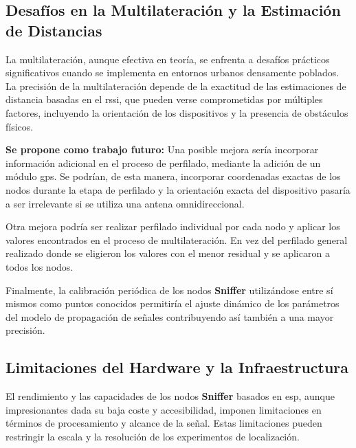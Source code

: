 \subsection{Desafíos en la Multilateración y la Estimación de Distancias}

La multilateración, aunque efectiva en teoría, se enfrenta a desafíos prácticos significativos cuando se implementa en entornos urbanos densamente poblados. La precisión de la multilateración depende de la exactitud de las estimaciones de distancia basadas en el \acs{rssi}, que pueden verse comprometidas por múltiples factores, incluyendo la orientación de los dispositivos y la presencia de obstáculos físicos.

\textbf{Se propone como trabajo futuro:}
Una posible mejora sería incorporar información adicional en el proceso de perfilado, mediante la adición de un módulo \acs{gps}. Se podrían, de esta manera, incorporar coordenadas exactas de los nodos durante la etapa de perfilado y la orientación exacta del dispositivo pasaría a ser irrelevante si se utiliza una antena omnidireccional. 

Otra mejora podría ser realizar perfilado individual por cada nodo y aplicar los valores encontrados en el proceso de multilateración. En vez del perfilado general realizado donde se eligieron los valores con el menor residual y se aplicaron a todos los nodos.

Finalmente, la calibración periódica de los nodos \textbf{Sniffer} utilizándose entre sí mismos como puntos conocidos permitiría el ajuste dinámico de los parámetros del modelo de propagación de señales contribuyendo así también a una mayor precisión.




\subsection{Limitaciones del Hardware y la Infraestructura}

El rendimiento y las capacidades de los nodos \textbf{Sniffer} basados en \acs{esp}, aunque impresionantes dada su baja coste y accesibilidad, imponen limitaciones en términos de procesamiento y alcance de la señal. Estas limitaciones pueden restringir la escala y la resolución de los experimentos de localización.


